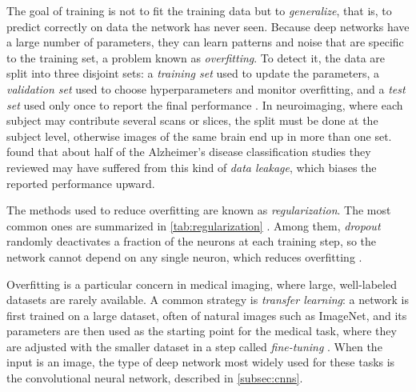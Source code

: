 The goal of training is not to fit the training data but to \emph{generalize}, that is, to predict correctly on data the network has never seen. Because deep networks have a large number of parameters, they can learn patterns and noise that are specific to the training set, a problem known as \emph{overfitting}. To detect it, the data are split into three disjoint sets: a \emph{training set} used to update the parameters, a \emph{validation set} used to choose hyperparameters and monitor overfitting, and a \emph{test set} used only once to report the final performance \parencite{yamashita2018convolutional}. In neuroimaging, where each subject may contribute several scans or slices, the split must be done at the subject level, otherwise images of the same brain end up in more than one set. \textcite{wen2020convolutional} found that about half of the Alzheimer's disease classification studies they reviewed may have suffered from this kind of \emph{data leakage}, which biases the reported performance upward.

The methods used to reduce overfitting are known as \emph{regularization}. The most common ones are summarized in \cref{tab:regularization} \parencite{yamashita2018convolutional}. Among them, \emph{dropout} randomly deactivates a fraction of the neurons at each training step, so the network cannot depend on any single neuron, which reduces overfitting \parencite{srivastava2014dropout}.



Overfitting is a particular concern in medical imaging, where large, well-labeled datasets are rarely available. A common strategy is \emph{transfer learning}: a network is first trained on a large dataset, often of natural images such as ImageNet, and its parameters are then used as the starting point for the medical task, where they are adjusted with the smaller dataset in a step called \emph{fine-tuning} \parencite{yamashita2018convolutional}. When the input is an image, the type of deep network most widely used for these tasks is the convolutional neural network, described in \cref{subsec:cnns}.

